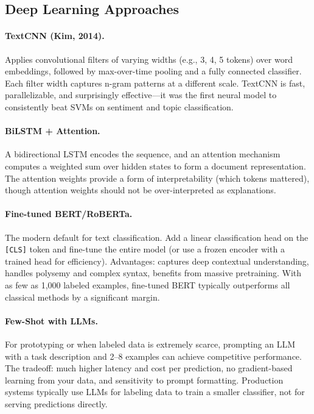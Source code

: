 \subsection{Deep Learning Approaches}
\label{sec:deep_text_clf}

\paragraph{TextCNN (Kim, 2014).}
Applies convolutional filters of varying widths (e.g., 3, 4, 5 tokens) over word embeddings,
followed by max-over-time pooling and a fully connected classifier.  Each filter width captures
n-gram patterns at a different scale.  TextCNN is fast, parallelizable, and surprisingly
effective---it was the first neural model to consistently beat SVMs on sentiment and topic
classification.

\paragraph{BiLSTM + Attention.}
A bidirectional LSTM encodes the sequence, and an attention mechanism computes a weighted sum
over hidden states to form a document representation.  The attention weights provide a form of
interpretability (which tokens mattered), though attention weights should not be over-interpreted
as explanations.

\paragraph{Fine-tuned BERT/RoBERTa.}
The modern default for text classification.  Add a linear classification head on the
\texttt{[CLS]} token and fine-tune the entire model (or use a frozen encoder with a trained
head for efficiency).  Advantages: captures deep contextual understanding, handles polysemy
and complex syntax, benefits from massive pretraining.  With as few as 1,000 labeled examples,
fine-tuned BERT typically outperforms all classical methods by a significant margin.

\paragraph{Few-Shot with LLMs.}
For prototyping or when labeled data is extremely scarce, prompting an LLM with a task
description and 2--8 examples can achieve competitive performance.  The tradeoff: much higher
latency and cost per prediction, no gradient-based learning from your data, and sensitivity
to prompt formatting.  Production systems typically use LLMs for labeling data to train a
smaller classifier, not for serving predictions directly.

